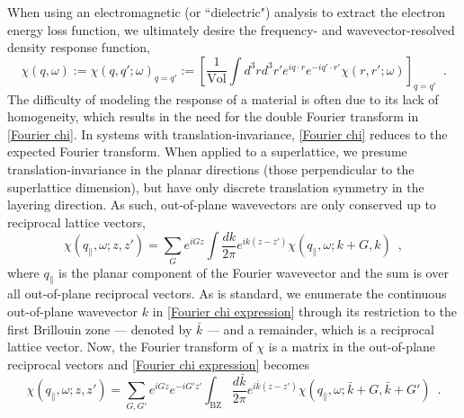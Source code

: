 \documentclass{article}
\newcommand{\lb}{\left[}
\newcommand{\vol}{\text{Vol}}
\newcommand{\rb}{\right]}
\begin{document}
When using an electromagnetic (or ``dielectric") analysis to extract the electron energy loss function, we ultimately desire the frequency- and wavevector-resolved density response function,
\begin{equation}
    \label{Fourier chi}
    \chi(q,\omega):=\chi(q,q';\omega)_{q=q'}
    :=
    \lb\frac{1}{\vol}\int d^3 r d^3 r' e^{iq\cdot r} e^{-i q'\cdot r'}\chi(r,r';\omega)\rb_{q=q'}
    \,\,\,.
\end{equation}
The difficulty of modeling the response of a material is often due to its lack of homogeneity, which results in the need for the double Fourier transform in \eqref{Fourier chi}.  In systems with translation-invariance, \eqref{Fourier chi} reduces to the expected Fourier transform.  When applied to a superlattice, we presume translation-invariance in the planar directions (those perpendicular to the superlattice dimension), but have only discrete translation symmetry in the layering direction.  As such, out-of-plane wavevectors are only conserved up to reciprocal lattice vectors,
\begin{equation}
    \label{Fourier chi expression}
    \chi(q_\parallel,\omega;z,z') = \sum_G e^{iG z} \int \frac{dk}{2\pi} e^{ik(z-z')}\chi(q_\parallel,\omega;k+G,k)
    \,\,\,,
\end{equation}
where $q_\parallel$ is the planar component of the Fourier wavevector and the sum is over all out-of-plane reciprocal vectors.  As is standard, we enumerate the continuous out-of-plane wavevector $k$ in \eqref{Fourier chi expression} through its restriction to the first Brillouin zone --- denoted by $\bar k$ --- and a remainder, which is a reciprocal lattice vector.  Now, the Fourier transform of $\chi$ is a matrix in the out-of-plane reciprocal vectors and \eqref{Fourier chi expression} becomes
\begin{equation}
    \label{Fourier chi G matrix}
    \chi(q_\parallel,\omega;z,z') = \sum_{G,G'} e^{iG z} e^{-i G' z'} \int_\text{BZ} \frac{d\bar k}{2\pi} e^{i\bar k(z-z')}\chi(q_\parallel,\omega;\bar k+G,\bar k+G')
    \,\,\,.
\end{equation}
\end{document}
